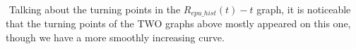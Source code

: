 \documentclass[12pt]{article}  %
\begin{document}
​		Talking about the turning points in the $R_{epu\_hist}(t)-t$ graph, it is noticeable that the turning points of the TWO graphs above mostly appeared on this one, though we have a more smoothly increasing curve.

\end{document}
